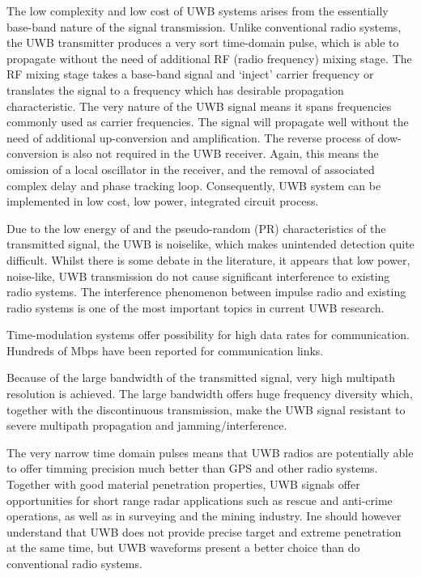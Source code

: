 \documentclass[\main/main.tex]{subfiles}
\begin{document}
The low complexity and low cost of UWB systems arises from the essentially base-band nature of the signal transmission. Unlike conventional radio systems, the UWB transmitter produces a very sort time-domain pulse, which is able to propagate without the need of additional RF (radio frequency) mixing stage. The RF mixing stage takes a base-band signal and `inject' carrier frequency or translates the signal to a frequency which has desirable propagation characteristic. The very nature of the UWB signal means it spans frequencies commonly used as carrier frequencies. The signal will propagate well without the need of additional up-conversion and amplification. The reverse process of dow-conversion is also not required in the UWB receiver. Again, this means the omission of a local oscillator in the receiver, and the removal of associated complex delay and phase tracking loop. Consequently, UWB system can be implemented in low cost, low power, integrated circuit process.

Due to the low energy of and the pseudo-random (PR) characteristics of the transmitted signal, the UWB is noiselike, which makes unintended detection quite difficult. Whilst there is some debate in the literature, it appears that low power, noise-like, UWB transmission do not cause significant interference to existing radio systems. The interference phenomenon between impulse radio and existing radio systems is one of the most important topics in current UWB research.

Time-modulation systems offer possibility for high data rates for communication. Hundreds of Mbps have been reported for communication links.

Because of the large bandwidth of the transmitted signal, very high multipath resolution is achieved. The large bandwidth offers huge frequency diversity which, together with the discontinuous transmission, make the UWB signal resistant to severe multipath propagation and jamming/interference. 

The very narrow time domain pulses means that UWB radios are potentially able to offer timming precision much better than GPS and other radio systems. Together with good material penetration properties, UWB signals offer opportunities for short range radar applications such as rescue and anti-crime operations, as well as in surveying and the mining industry. Ine should however understand that UWB does not provide precise target and extreme penetration at the same time, but UWB waveforms present a better choice than do conventional radio systems.
\end{document}
